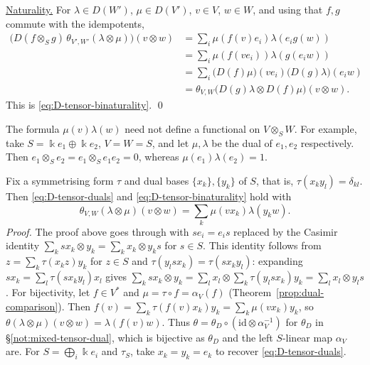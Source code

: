 \begin{supplementary}
\underline{Naturality.}
For $\lambda\in D(W')$, $\mu\in D(V')$, $v\in V$, $w\in W$, and using that $f,g$ commute with the idempotents,
\[
\begin{aligned}
\bigl(D(f\otimes_Sg)\,\theta_{V',W'}(\lambda\otimes\mu)\bigr)(v\otimes w)
&=\sum_i\mu(f(v)e_i)\lambda(e_ig(w))\\
&=\sum_i\mu(f(ve_i))\lambda(g(e_iw))\\
&=\sum_i\bigl(D(f)\mu\bigr)(ve_i)\bigl(D(g)\lambda\bigr)(e_iw)\\
&=\theta_{V,W}\bigl(D(g)\lambda\otimes D(f)\mu\bigr)(v\otimes w).
\end{aligned}
\]
This is \eqref{eq:D-tensor-binaturality}.
\hfill\qed
\end{supplementary}


\begin{remark}
The formula $\mu(v)\lambda(w)$ need not define a functional on $V\otimes_S W$.
For example, take $S=\Bbbk e_1\oplus\Bbbk e_2$, $V=W=S$, and let $\mu,\lambda$ be the dual of $e_1, e_2$ respectively.
Then $e_1\otimes_S e_2=e_1\otimes_S e_1e_2=0$, whereas $\mu(e_1)\lambda(e_2)=1$.
\end{remark}

\begin{advanced}
\begin{remark}[General $S$]\label{rem:D-tensor-duals-general}
Fix a symmetrising form $\tau$ and dual bases $\{x_k\},\{y_k\}$ of $S$, that is, $\tau(x_ky_l)=\delta_{kl}$.
Then \eqref{eq:D-tensor-duals} and \eqref{eq:D-tensor-binaturality} hold with
\[
\theta_{V,W}(\lambda\otimes\mu)(v\otimes w)=\sum_k\mu(vx_k)\lambda(y_kw).
\]
\emph{Proof.}
The proof above goes through with $se_i=e_is$ replaced by the Casimir identity $\sum_ksx_k\otimes y_k=\sum_kx_k\otimes y_ks$ for $s\in S$.
This identity follows from $z=\sum_k\tau(x_kz)y_k$ for $z\in S$ and $\tau(y_lsx_k)=\tau(sx_ky_l)$: expanding $sx_k=\sum_l\tau(sx_ky_l)x_l$ gives $\sum_ksx_k\otimes y_k=\sum_lx_l\otimes\sum_k\tau(y_lsx_k)y_k=\sum_lx_l\otimes y_ls$.
For bijectivity, let $f\in V^*$ and $\mu=\tau\circ f=\alpha_V(f)$ (Theorem~\ref{prop:dual-comparison}).
Then $f(v)=\sum_k\tau(f(v)x_k)y_k=\sum_k\mu(vx_k)y_k$, so $\theta(\lambda\otimes\mu)(v\otimes w)=\lambda(f(v)w)$.
Thus $\theta=\theta_D\circ(\mathrm{id}\otimes\alpha_V^{-1})$ for $\theta_D$ in \S\ref{not:mixed-tensor-dual}, which is bijective as $\theta_D$ and the left $S$-linear map $\alpha_V$ are.
For $S=\bigoplus_i\Bbbk e_i$ and $\tau_S$, take $x_k=y_k=e_k$ to recover \eqref{eq:D-tensor-duals}.
\end{remark}
\end{advanced}

